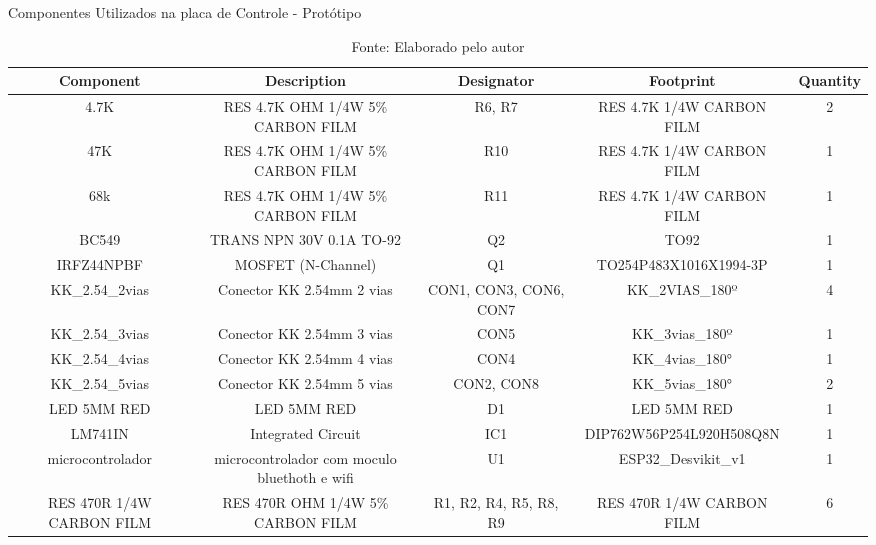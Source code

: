 \documentclass[../delivery_hospital_report.tex]{subfiles}
\begin{document}
\begin{table}[]
\caption{Componentes Utilizados na placa de Controle - Protótipo}
\centering
\begin{adjustbox}{width=\columnwidth,center}
\begin{tabular}{|c|c|c|c|c|}
\hline
Component                   & Description                                  & Designator             & Footprint                 & Quantity \\ \hline
4.7K                      & RES 4.7K OHM 1/4W 5\% CARBON FILM            & R6, R7                 & RES 4.7K 1/4W CARBON FILM & 2        \\ \hline
47K                       & RES 4.7K OHM 1/4W 5\% CARBON FILM            & R10                    & RES 4.7K 1/4W CARBON FILM & 1        \\ \hline
68k                       & RES 4.7K OHM 1/4W 5\% CARBON FILM            & R11                    & RES 4.7K 1/4W CARBON FILM & 1        \\ \hline
BC549                     & TRANS NPN 30V 0.1A TO-92                     & Q2                     & TO92                      & 1        \\ \hline
IRFZ44NPBF                & MOSFET (N-Channel)                           & Q1                     & TO254P483X1016X1994-3P    & 1        \\ \hline
KK\_2.54\_2vias           & Conector KK 2.54mm 2 vias                    & CON1, CON3, CON6, CON7 & KK\_2VIAS\_180º           & 4        \\ \hline
KK\_2.54\_3vias           & Conector KK 2.54mm 3 vias                    & CON5                   & KK\_3vias\_180º           & 1        \\ \hline
KK\_2.54\_4vias           & Conector KK 2.54mm 4 vias                    & CON4                   & KK\_4vias\_180°           & 1        \\ \hline
KK\_2.54\_5vias           & Conector KK 2.54mm 5 vias                    & CON2, CON8             & KK\_5vias\_180°           & 2        \\ \hline
LED 5MM RED               & LED 5MM RED                                  & D1                     & LED 5MM RED               & 1        \\ \hline
LM741IN                   & Integrated Circuit                           & IC1                    & DIP762W56P254L920H508Q8N  & 1        \\ \hline
microcontrolador          & microcontrolador com moculo bluethoth e wifi & U1                     & ESP32\_Desvikit\_v1       & 1        \\ \hline
RES 470R 1/4W CARBON FILM & RES 470R OHM 1/4W 5\% CARBON FILM            & R1, R2, R4, R5, R8, R9 & RES 470R 1/4W CARBON FILM & 6        \\ \hline
\end{tabular}
\end{adjustbox}
\centering
\caption*{Fonte: Elaborado pelo autor}
\label{table:voc}
\end{table}
\end{document}
